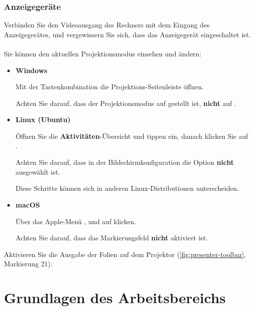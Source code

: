 \subsubsection{Anzeigegeräte}
Verbinden Sie den Videoausgang des Rechners mit dem Eingang des Anzeigegerätes, und vergewissern Sie sich, dass das Anzeigegerät eingeschaltet ist.
\\\\
Sie können den aktuellen Projektionsmodus einsehen und ändern:
\begin{itemize}
	\item \textbf{Windows}\par
	Mit der Tastenkombination  die Projektions-Seitenleiste öffnen.
	\begin{note}
		Achten Sie darauf, dass der Projektionsmodus auf  gestellt ist, \textbf{nicht} auf .
	\end{note}

	\item \textbf{Linux (Ubuntu)}\par
	Öffnen Sie die \textbf{Aktivitäten}-Übersicht und tippen  ein, danach klicken Sie auf \quote{Anzeigegeräte}.
	\begin{note}
		Achten Sie darauf, dass in der Bildschirmkonfiguration die Option  \textbf{nicht} ausgewählt ist.
	\end{note}
	\begin{info}
		Diese Schritte können sich in anderen Linux-Distributionen unterscheiden.
	\end{info}

	\item \textbf{macOS}\par
	Über das Apple-Menü , und auf  klicken.
	\begin{note}
		Achten Sie darauf, dass das Markierungsfeld  \textbf{nicht} aktiviert ist.
	\end{note}
\end{itemize}

Aktivieren Sie die Ausgabe der Folien auf dem Projektor (\autoref{fig:presenter-toolbar}, Markierung 21).


\section{Grundlagen des Arbeitsbereichs}

